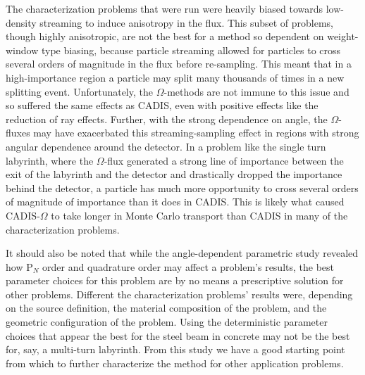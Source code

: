 \documentclass[12pt]{article}
\begin{document}
The characterization problems that were run were heavily biased towards
low-density streaming to induce anisotropy in the flux. This subset of
problems, though highly anisotropic, are not the best
for a method so dependent on weight-window type biasing,
because particle streaming allowed for particles to cross several orders of
magnitude in the flux before re-sampling. This meant that in a high-importance
region a particle may split many thousands of times in a new splitting event.
Unfortunately, the $\Omega$-methods are not immune to this issue and so suffered
the same effects as CADIS, even with positive effects like the reduction of ray
effects. Further, with the strong dependence on angle, the $\Omega$-fluxes may
have exacerbated this streaming-sampling effect in regions with strong angular
dependence around the detector. In a problem like the single turn labyrinth,
where the $\Omega$-flux generated a strong line of importance between the exit
of the labyrinth and the detector and drastically dropped the importance behind
the detector, a particle has much more opportunity to cross several orders of
magnitude of importance than it does in CADIS. This is likely what caused
CADIS-$\Omega$ to take longer in Monte Carlo transport than CADIS in many of the
characterization problems.

It should also be noted that while the angle-dependent parametric study revealed
how P$_N$ order and quadrature order may affect a problem's results, the
best parameter choices for this problem are by no means a prescriptive solution
for other problems. Different the characterization problems' results were, depending on
the source definition, the material composition of the problem, and the
geometric configuration of the problem. Using the deterministic parameter
choices that appear the best for the steel beam in concrete may not be the best
for, say, a multi-turn labyrinth. From this study we have a good starting point
from which to further characterize the method for other application problems.




\end{document}
